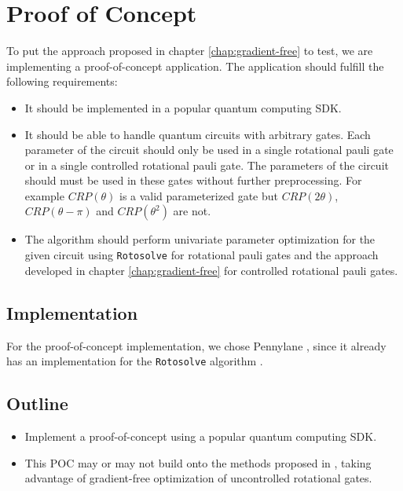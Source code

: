 \chapter{Proof of Concept}
\label{chap:proof-of-concept}

To put the approach proposed in chapter \ref{chap:gradient-free} to test,
we are implementing a proof-of-concept application.
The application should fulfill the following requirements:

\begin{itemize}
    \item
        It should be implemented in a popular quantum computing SDK.
    \item
        It should be able to handle quantum circuits with arbitrary gates.
        Each parameter of the circuit should only be used in a single rotational
        pauli gate or in a single controlled rotational pauli gate.
        The parameters of the circuit should must be used in these gates without
        further preprocessing.
        For example $CRP(\theta)$ is a valid parameterized gate but
        $CRP(2\theta)$, $CRP(\theta - \pi)$ and $CRP(\theta^2)$ are not.
    \item
        The algorithm should perform univariate parameter optimization for the
        given circuit using \texttt{Rotosolve} \cite{ostaszewski_structure_2021}
        for rotational pauli gates and the approach developed in
        chapter \ref{chap:gradient-free} for controlled rotational pauli gates.
\end{itemize}

\section{Implementation}
For the proof-of-concept implementation, we chose Pennylane
\cite{bergholm_pennylane_2022}, since it already has an implementation for the
\texttt{Rotosolve} algorithm \cite{ostaszewski_structure_2021}.

\section{Outline}
\begin{itemize}
    \item
        Implement a proof-of-concept using a popular quantum computing SDK.
    \item
        This POC may or may not build onto the methods proposed in
        \cite{wendenius_gradient-free_2023,ostaszewski_structure_2021},
        taking advantage of gradient-free optimization of uncontrolled
        rotational gates.
\end{itemize}